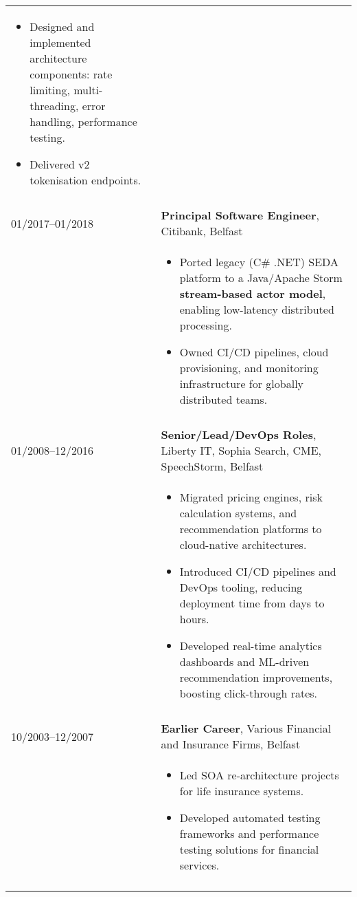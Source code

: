 \documentclass[2pt,a4paper]{article}
\newlength{\datecolumn}
\newlength{\textcolumn}
\begin{document}
\begin{longtable}{p{\datecolumn} p{\textcolumn}}
\begin{itemize}
                        \item Designed and implemented architecture components: rate limiting, multi-threading, error handling, performance testing.
                        \item Delivered v2 tokenisation endpoints.
                   \end{itemize} \\ \\
01/2017--01/2018 & \textbf{Principal Software Engineer}, Citibank, Belfast \\
                 & \begin{itemize}
                        \item Ported legacy (C\# .NET) SEDA platform to a Java/Apache Storm \textbf{stream-based actor model}, enabling low-latency distributed processing.
                        \item Owned CI/CD pipelines, cloud provisioning, and monitoring infrastructure for globally distributed teams.
                   \end{itemize} \\ \\
01/2008--12/2016 & \textbf{Senior/Lead/DevOps Roles}, Liberty IT, Sophia Search, CME, SpeechStorm, Belfast \\
                 & \begin{itemize}
                        \item Migrated pricing engines, risk calculation systems, and recommendation platforms to cloud-native architectures.
                        \item Introduced CI/CD pipelines and DevOps tooling, reducing deployment time from days to hours.
                        \item Developed real-time analytics dashboards and ML-driven recommendation improvements, boosting click-through rates.
                   \end{itemize} \\ \\
10/2003--12/2007 & \textbf{Earlier Career}, Various Financial and Insurance Firms, Belfast \\
                 & \begin{itemize}
                        \item Led SOA re-architecture projects for life insurance systems.
                        \item Developed automated testing frameworks and performance testing solutions for financial services.
                   \end{itemize} \\ \\
\end{longtable}
\end{document}

